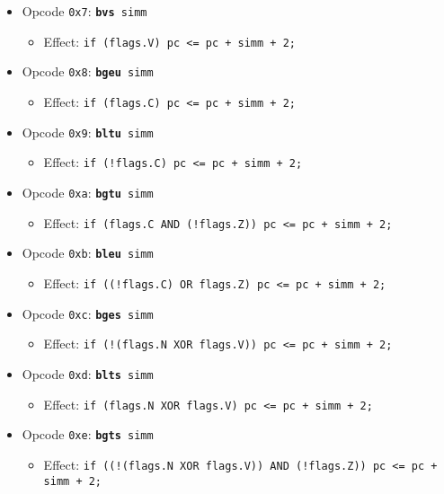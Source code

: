\documentclass{article}
\begin{document}
\begin{itemize}
		\item Opcode \texttt{0x7}:
			\texttt{\textbf{bvs} simm}
		\begin{itemize}
			\item Effect:
				\texttt{if (flags.V) pc <= pc + simm + 2;}
		\end{itemize}

		\item Opcode \texttt{0x8}:
			\texttt{\textbf{bgeu} simm}
		\begin{itemize}
			\item Effect:
				\texttt{if (flags.C) pc <= pc + simm + 2;}
		\end{itemize}

		\item Opcode \texttt{0x9}:
			\texttt{\textbf{bltu} simm}
		\begin{itemize}
			\item Effect:
				\texttt{if (!flags.C) pc <= pc + simm + 2;}
		\end{itemize}

		\item Opcode \texttt{0xa}:
			\texttt{\textbf{bgtu} simm}
		\begin{itemize}
			\item Effect:
				\texttt{if (flags.C AND (!flags.Z)) pc <= pc + simm + 2;}
		\end{itemize}

		\item Opcode \texttt{0xb}:
			\texttt{\textbf{bleu} simm}
		\begin{itemize}
			\item Effect:
				\texttt{if ((!flags.C) OR flags.Z) pc <= pc + simm + 2;}
		\end{itemize}

		\item Opcode \texttt{0xc}:
			\texttt{\textbf{bges} simm}
		\begin{itemize}
			\item Effect:
				\texttt{if (!(flags.N XOR flags.V)) pc <= pc + simm + 2;}
		\end{itemize}

		\item Opcode \texttt{0xd}:
			\texttt{\textbf{blts} simm}
		\begin{itemize}
			\item Effect:
				\texttt{if (flags.N XOR flags.V) pc <= pc + simm + 2;}
		\end{itemize}

		\item Opcode \texttt{0xe}:
			\texttt{\textbf{bgts} simm}
		\begin{itemize}
			\item Effect:
				\texttt{if ((!(flags.N XOR flags.V)) AND (!flags.Z))
					pc <= pc + simm + 2;}
		\end{itemize}


\end{itemize}
\end{document}

